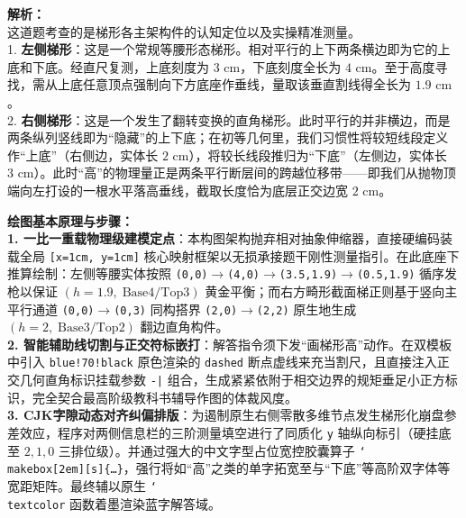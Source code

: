 \vspace{0.8cm}

{\small\color{gray}
\textbf{解析：}\\
这道题考查的是梯形各主架构件的认知定位以及实操精准测量。\\
1. \textbf{左侧梯形}：这是一个常规等腰形态梯形。相对平行的上下两条横边即为它的上底和下底。经直尺复测，上底刻度为 $3\text{ cm}$，下底刻度全长为 $4\text{ cm}$。至于高度寻找，需从上底任意顶点强制向下方底座作垂线，量取该垂直割线得全长为 $1.9\text{ cm}$。\\
2. \textbf{右侧梯形}：这是一个发生了翻转变换的直角梯形。此时平行的并非横边，而是两条纵列竖线即为“隐藏”的上下底；在初等几何里，我们习惯性将较短线段定义作“上底”（右侧边，实体长 $2\text{ cm}$），将较长线段推归为“下底”（左侧边，实体长 $3\text{ cm}$）。此时“高”的物理量正是两条平行断层间的跨越位移带——即我们从抛物顶端向左打设的一根水平落高垂线，截取长度恰为底层正交边宽 $2\text{ cm}$。
}

\vspace{0.6cm}

{\small\color{blue!70!black}
\textbf{绘图基本原理与步骤：}\\
\textbf{1. 一比一重载物理级建模定点}：本构图架构抛弃相对抽象伸缩器，直接硬编码装载全局 \texttt{[x=1cm, y=1cm]} 核心映射框架以无损承接题干刚性测量指引。在此底座下推算绘制：左侧等腰实体按照 \texttt{(0,0)$\to$(4,0)$\to$(3.5,1.9)$\to$(0.5,1.9)} 循序发枪以保证 $(h{=}1.9,\; \text{Base}4 / \text{Top}3)$ 黄金平衡；而右方畸形截面梯正则基于竖向主平行通道 \texttt{(0,0)$\to$(0,3)} 同构搭界 \texttt{(2,0)$\to$(2,2)} 原生地生成 $(h{=}2,\; \text{Base}3 / \text{Top}2)$ 翻边直角构件。\\
\textbf{2. 智能辅助线切割与正交符标嵌打}：解答指令须下发“画梯形高”动作。在双模板中引入 \texttt{blue!70!black} 原色渲染的 \texttt{dashed} 断点虚线来充当割尺，且直接注入正交几何直角标识挂载参数 \texttt{-|} 组合，生成紧紧依附于相交边界的规矩垂足小正方标识，完全契合最高阶级教科书辅导作图的体裁风度。\\
\textbf{3. CJK字隙动态对齐纠偏排版}：为遏制原生右侧零散多维节点发生梯形化崩盘参差效应，程序对两侧信息栏的三阶测量填空进行了同质化 \texttt{y} 轴纵向标引（硬挂底至 $2, 1, 0$ 三排位级）。并通过强大的中文字型占位宽控胶囊算子 \texttt{\char`\\makebox[2em][s]\{\dots\}}，强行将如“高”之类的单字拓宽至与“下底”等高阶双字体等宽距矩阵。最终辅以原生 \texttt{\char`\\textcolor} 函数着墨渲染蓝字解答域。
}


\newpage

